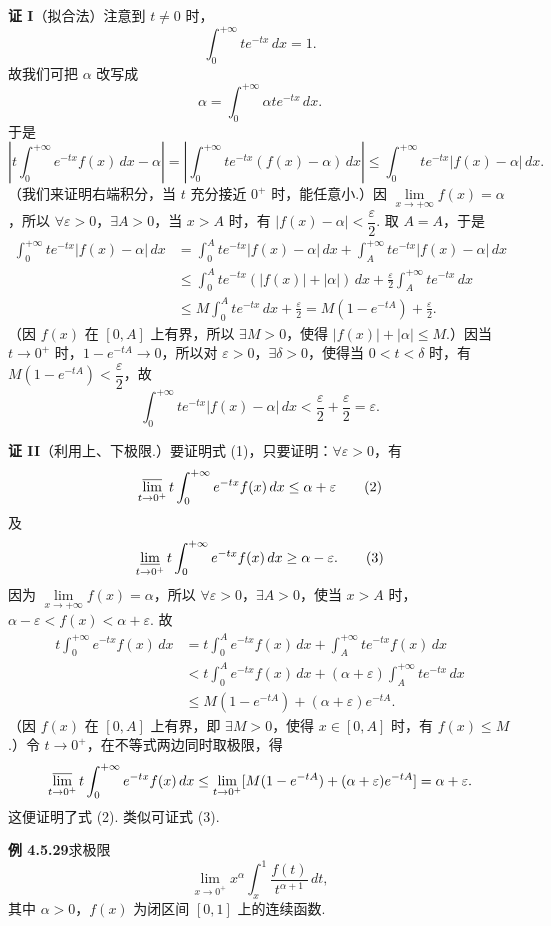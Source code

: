 \documentclass[UTF8,12pt,a4paper,fontset=fandol]{ctexart}
\begin{document}
\noindent\textbf{证 I}\quad （拟合法）注意到 $t\ne0$ 时，
\[
\int_0^{+\infty}te^{-tx}\,dx=1.
\]
故我们可把 $\alpha$ 改写成
\[
\alpha=\int_0^{+\infty}\alpha te^{-tx}\,dx.
\]
于是
\[
\left|t\int_0^{+\infty}e^{-tx}f(x)\,dx-\alpha\right|
=\left|\int_0^{+\infty}te^{-tx}(f(x)-\alpha)\,dx\right|
\le\int_0^{+\infty}te^{-tx}|f(x)-\alpha|\,dx.
\]
（我们来证明右端积分，当 $t$ 充分接近 $0^+$ 时，能任意小.）因 $\lim\limits_{x\to+\infty}f(x)=\alpha$，所以 $\forall\varepsilon>0$，$\exists A>0$，当 $x>A$ 时，有 $|f(x)-\alpha|<\dfrac\varepsilon2$. 取 $A=A$，于是
\[
\begin{aligned}
\int_0^{+\infty}te^{-tx}|f(x)-\alpha|\,dx
&=\int_0^Ate^{-tx}|f(x)-\alpha|\,dx
+\int_A^{+\infty}te^{-tx}|f(x)-\alpha|\,dx\\
&\le\int_0^Ate^{-tx}(|f(x)|+|\alpha|)\,dx
+\frac\varepsilon2\int_A^{+\infty}te^{-tx}\,dx\\
&\le M\int_0^Ate^{-tx}\,dx+\frac\varepsilon2
=M(1-e^{-tA})+\frac\varepsilon2.
\end{aligned}
\]
（因 $f(x)$ 在 $[0,A]$ 上有界，所以 $\exists M>0$，使得 $|f(x)|+|\alpha|\le M$.）因当 $t\to0^+$ 时，$1-e^{-tA}\to0$，所以对 $\varepsilon>0$，$\exists\delta>0$，使得当 $0<t<\delta$ 时，有 $M(1-e^{-tA})<\dfrac\varepsilon2$，故
\[
\int_0^{+\infty}te^{-tx}|f(x)-\alpha|\,dx
<\frac\varepsilon2+\frac\varepsilon2=\varepsilon.
\]

\noindent\textbf{证 II}\quad （利用上、下极限.）要证明式 (1)，只要证明：$\forall\varepsilon>0$，有
\[
\varlimsup_{t\to0^+}t\int_0^{+\infty}e^{-tx}f(x)\,dx\le\alpha+\varepsilon \tag{2}
\]
及
\[
\varliminf_{t\to0^+}t\int_0^{+\infty}e^{-tx}f(x)\,dx\ge\alpha-\varepsilon. \tag{3}
\]
因为 $\lim\limits_{x\to+\infty}f(x)=\alpha$，所以 $\forall\varepsilon>0$，$\exists A>0$，使当 $x>A$ 时，$\alpha-\varepsilon<f(x)<\alpha+\varepsilon$. 故
\[
\begin{aligned}
t\int_0^{+\infty}e^{-tx}f(x)\,dx
&=t\int_0^Ae^{-tx}f(x)\,dx+\int_A^{+\infty}te^{-tx}f(x)\,dx\\
&<t\int_0^Ae^{-tx}f(x)\,dx
+(\alpha+\varepsilon)\int_A^{+\infty}te^{-tx}\,dx\\
&\le M(1-e^{-tA})+(\alpha+\varepsilon)e^{-tA}.
\end{aligned}
\]
（因 $f(x)$ 在 $[0,A]$ 上有界，即 $\exists M>0$，使得 $x\in[0,A]$ 时，有 $f(x)\le M$.）令 $t\to0^+$，在不等式两边同时取极限，得
\[
\varlimsup_{t\to0^+}t\int_0^{+\infty}e^{-tx}f(x)\,dx
\le\lim_{t\to0^+}[M(1-e^{-tA})+(\alpha+\varepsilon)e^{-tA}]
=\alpha+\varepsilon.
\]
这便证明了式 (2). 类似可证式 (3).

\noindent\textbf{例 4.5.29}\quad 求极限
\[
\lim_{x\to0^+}x^\alpha\int_x^1\frac{f(t)}{t^{\alpha+1}}\,dt,
\]
其中 $\alpha>0$，$f(x)$ 为闭区间 $[0,1]$ 上的连续函数.
\end{document}
